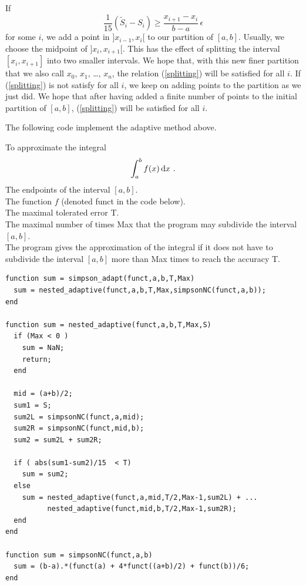 If
\[
\frac{1}{15}\left( \tilde{S}_i-S_i \right) \geq
\frac{x_{i+1}-x_i}{b-a} \, \epsilon
\]
for some $i$, we add a point in $]x_{i-1},x_i[$ to our partition of
$[a,b]$.  Usually, we choose the midpoint of $]x_i,x_{i+1}[$.  This
has the effect of splitting the interval $[x_i,x_{i+1}]$ into two
smaller intervals.  We hope that, with this new finer partition that
we also call $x_0$, $x_1$, \ldots, $x_n$, the relation
(\ref{splitting}) will be satisfied for all $i$.
If (\ref{splitting}) is not satisfy for all $i$, we keep on adding
points to the partition as we just did.  We hope that after having
added a finite number of points to the initial partition of $[a,b]$,
(\ref{splitting}) will be satisfied for all $i$.

The following code implement the adaptive method above.

\begin{code}
To approximate the integral
\[
\int_a^b f(x) \,\mathrm{d}x \ .
\]
 The endpoints of the interval $[a,b]$.\\
The function $f$ (denoted  funct  in the code below).\\
The maximal tolerated error  T.\\
The maximal number of times  Max  that the program may subdivide the
interval $[a,b]$.\\
 The program gives the approximation of the
integral if it does not have to subdivide the interval $[a,b]$ more
than  Max  times to reach the accuracy  T.
\small
\begin{verbatim}
function sum = simpson_adapt(funct,a,b,T,Max)
  sum = nested_adaptive(funct,a,b,T,Max,simpsonNC(funct,a,b));
end

function sum = nested_adaptive(funct,a,b,T,Max,S)
  if (Max < 0 )
    sum = NaN;
    return;
  end

  mid = (a+b)/2;
  sum1 = S;
  sum2L = simpsonNC(funct,a,mid);
  sum2R = simpsonNC(funct,mid,b);
  sum2 = sum2L + sum2R;
 
  if ( abs(sum1-sum2)/15  < T)
    sum = sum2;
  else
    sum = nested_adaptive(funct,a,mid,T/2,Max-1,sum2L) + ...
          nested_adaptive(funct,mid,b,T/2,Max-1,sum2R);
  end
end

function sum = simpsonNC(funct,a,b)
  sum = (b-a).*(funct(a) + 4*funct((a+b)/2) + funct(b))/6;
end
\end{verbatim}
\end{code}

